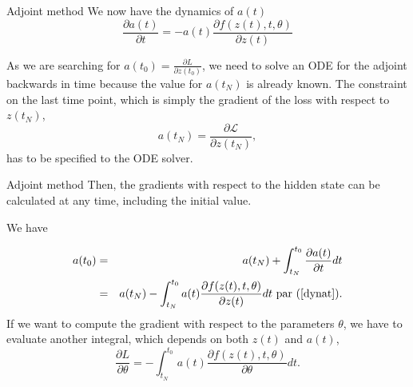 \documentclass[11pt]{beamer}
\begin{document}
\begin{frame}{Adjoint method}
We now have the dynamics of $a(t)$
\begin{equation}
\label{dynat}
\frac{\partial a(t)}{\partial t} = -a(t)\frac{\partial f(z(t),t,\theta)} {\partial z(t)}
\end{equation}
 
As we are searching for $ a(t_0) = \frac{\partial L}{\partial z(t_0)}$, we need to solve an ODE for the adjoint backwards in time because the value for $a(t_N)$ is already known. The constraint on the last time point, which is simply the gradient of the loss with respect to $z(t_N)$, 
\begin{equation*}
a(t_N) = \frac{\partial \mathcal{L}}{\partial z(t_N)},
\end{equation*}
has to be specified to the ODE solver. 
\end{frame}

\begin{frame}{Adjoint method}
Then, the gradients with respect to the hidden state can be calculated at any time, including the initial value. 

We have 

\begin{eqnarray*}
a(t_0) &=& a(t_N) + \int^{t_0}_{t_N} \frac{\partial a(t)}{\partial t} dt \\
	   &=& a(t_N) - \int^{t_0}_{t_N} a(t) \frac{\partial f(z(t),t,\theta)} {\partial z(t)} dt \text{ par (\ref{dynat})}.
\end{eqnarray*}
If we want to compute the gradient with respect to the parameters $\theta$, we have to evaluate another integral, which depends on both $z(t)$ and $a(t)$,
\begin{equation}
\label{devtheta}
\frac{\partial L}{\partial \theta} = - \int^{t_0}_{t_N} a(t) \frac{\partial f(z(t),t,\theta)} {\partial \theta} dt.
\end{equation}
\end{frame}
\end{document}
